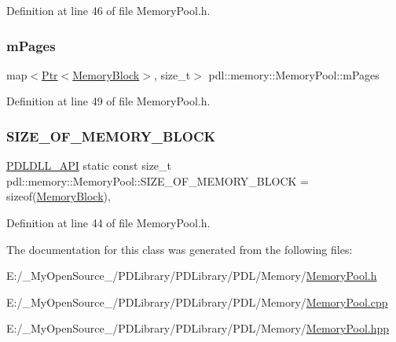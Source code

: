 Definition at line 46 of file Memory\+Pool.\+h.

\mbox{\label{classpdl_1_1memory_1_1_memory_pool_acd9ee17a9a4c3b8d6a1108a202b33123}} 
\subsubsection{\texorpdfstring{mPages}{mPages}}
{\footnotesize\ttfamily map$<$\mbox{\hyperlink{classpdl_1_1memory_1_1_ptr}{Ptr}}$<$\mbox{\hyperlink{classpdl_1_1memory_1_1_memory_pool_ae6b2ec19cb71cae4fa60b7d342a1743b}{Memory\+Block}}$>$, size\+\_\+t$>$ pdl\+::memory\+::\+Memory\+Pool\+::m\+Pages\hspace{0.3cm}{\ttfamily [private]}}



Definition at line 49 of file Memory\+Pool.\+h.

\mbox{\label{classpdl_1_1memory_1_1_memory_pool_ae55489655a25238b3f6e509050dac2dc}} 
\subsubsection{\texorpdfstring{SIZE\_OF\_MEMORY\_BLOCK}{SIZE\_OF\_MEMORY\_BLOCK}}
{\footnotesize\ttfamily \mbox{\hyperlink{_p_d_core_8h_ae8c5186e53170509c65eaabab6c2c705}{P\+D\+L\+D\+L\+L\+\_\+\+A\+PI}} static const size\+\_\+t pdl\+::memory\+::\+Memory\+Pool\+::\+S\+I\+Z\+E\+\_\+\+O\+F\+\_\+\+M\+E\+M\+O\+R\+Y\+\_\+\+B\+L\+O\+CK = sizeof(\mbox{\hyperlink{classpdl_1_1memory_1_1_memory_pool_ae6b2ec19cb71cae4fa60b7d342a1743b}{Memory\+Block}})\hspace{0.3cm}{\ttfamily [static]}, {\ttfamily [private]}}



Definition at line 44 of file Memory\+Pool.\+h.



The documentation for this class was generated from the following files\+:\begin{DoxyCompactItemize}
\item 
E\+:/\+\_\+\+My\+Open\+Source\+\_\+/\+P\+D\+Library/\+P\+D\+Library/\+P\+D\+L/\+Memory/\mbox{\hyperlink{_memory_pool_8h}{Memory\+Pool.\+h}}\item 
E\+:/\+\_\+\+My\+Open\+Source\+\_\+/\+P\+D\+Library/\+P\+D\+Library/\+P\+D\+L/\+Memory/\mbox{\hyperlink{_memory_pool_8cpp}{Memory\+Pool.\+cpp}}\item 
E\+:/\+\_\+\+My\+Open\+Source\+\_\+/\+P\+D\+Library/\+P\+D\+Library/\+P\+D\+L/\+Memory/\mbox{\hyperlink{_memory_pool_8hpp}{Memory\+Pool.\+hpp}}\end{DoxyCompactItemize}
